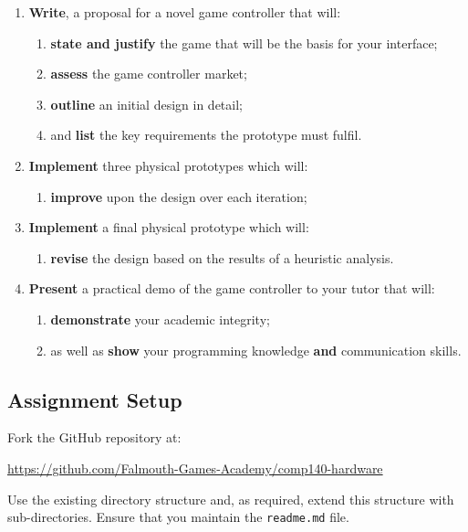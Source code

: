 \documentclass{../fal_assignment}
\begin{document}
\begin{enumerate}[label=(\Alph*)]
    \item \textbf{Write}, a proposal for a novel game controller that will:
    	\begin{enumerate}[label=\roman*.]
    		\item \textbf{state and justify} the game that will be the basis for your interface;
		\item \textbf{assess} the game controller market;
		\item \textbf{outline} an initial design in detail;
		\item and \textbf{list} the key requirements the prototype must fulfil.
	\end{enumerate}
    \item \textbf{Implement} three physical prototypes which will:
    	\begin{enumerate}[label=\roman*.]
		\item \textbf{improve} upon the design over each iteration;
	\end{enumerate}
    \item \textbf{Implement} a final physical prototype which will:
    	\begin{enumerate}[label=\roman*.]
		\item \textbf{revise} the design based on the results of a heuristic analysis.
	\end{enumerate}
    \item \textbf{Present} a practical demo of the game controller to your tutor that will:
    	\begin{enumerate}[label=\roman*.]
    		\item \textbf{demonstrate} your academic integrity;
    		\item as well as \textbf{show} your programming knowledge \textbf{and} communication skills.
	\end{enumerate}
\end{enumerate}

\subsection*{Assignment Setup}

Fork the GitHub repository at:

\indent \url{https://github.com/Falmouth-Games-Academy/comp140-hardware }

Use the existing directory structure and, as required, extend this structure with sub-directories. Ensure that you maintain the \texttt{readme.md} file.
\end{document}
